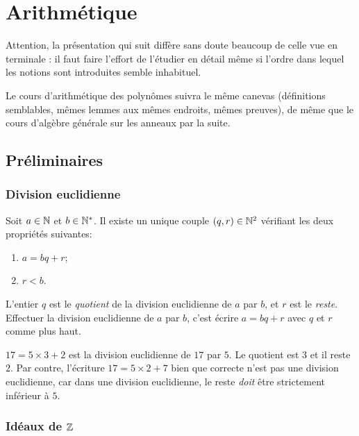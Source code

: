 \chapter{Arithmétique}
\minitoc
\hyperlink{toc}{\retourTOC}

Attention, la présentation qui suit diffère sans doute beaucoup de celle vue en terminale : il faut faire l'effort de l'étudier en détail même si l'ordre dans lequel les notions sont introduites semble inhabituel.

Le cours d'arithmétique des polynômes suivra le même canevas (définitions semblables, mêmes lemmes aux mêmes endroits, mêmes preuves), de même que le cours d'algèbre générale sur les anneaux par la suite.

\section{Préliminaires}

\subsection{Division euclidienne}
\begin{proposition}
Soit $a\in \mathbb{N}$ et $b\in \mathbb{N}^*$. Il existe un unique couple $(q,r) \in \mathbb{N}^2$ vérifiant les deux propriétés suivantes:
\begin{enumerate}
\item $a=bq+r$;
\item $r < b$.
\end{enumerate}
L'entier $q$ est le \emph{quotient} de la division euclidienne de $a$ par $b$, et $r$ est le \emph{reste}.
Effectuer la division euclidienne de $a$ par $b$, c'est écrire $a = bq+r$ avec $q$ et $r$ comme plus haut.
\end{proposition}

\begin{exemple}
$17=5\times 3 + 2$ est la division euclidienne de $17$ par $5$. Le quotient est $3$ et il reste $2$. Par contre, l'écriture $17=5\times 2+7$ bien que correcte  n'est pas une division euclidienne, car dans une division euclidienne, le reste \emph{doit} être strictement inférieur à $5$.
\end{exemple}

\subsection{Idéaux de $\mathbb{Z}$}

